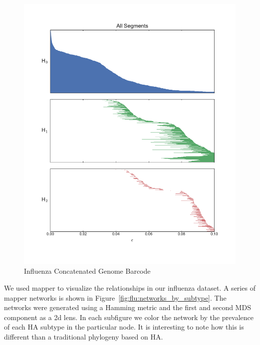 \begin{figure}
\centering
\includegraphics[]{fig/influenza/flu_concat_barcode.pdf}
\caption[Influenza Concatenated Genome Barcode]{Influenza Concatenated Genome Barcode}
\label{fig:flu:concatenated_genome_barcode}
\end{figure}

We used mapper to visualize the relationships in our influenza dataset.
A series of mapper networks is shown in Figure~\ref{fig:flu:networks_by_subtype}.
The networks were generated using a Hamming metric and the first and second MDS component as a 2d lens.
In each subfigure we color the network by the prevalence of each HA subtype in the particular node.
It is interesting to note how this is different than a traditional phylogeny based on HA.

